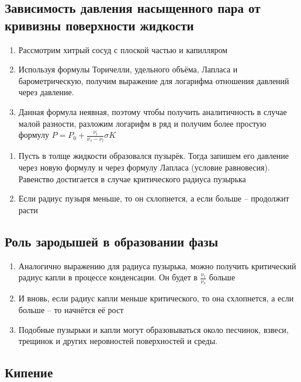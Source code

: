 \documentclass[a4paper, 14pt]{article}
\begin{document}
    \subsection{Зависимость давления насыщенного пара от кривизны поверхности жидкости}

    \begin{enumerate}
        \item Рассмотрим хитрый сосуд с плоской частью и капилляром
        \item Используя формулы Торичелли, удельного объёма, Лапласа и барометрическую, получим выражение для
        логарифма отношения давлений через давление.
        \item Данная формула неявная, поэтому чтобы получить аналитичность в случае малой разности, разложим логарифм
        в ряд и получим более простую формулу $P = P_0 + \frac{\nu_l}{\nu_s - \nu_l}\sigma K$
    \end{enumerate}

    \begin{enumerate}
        \item Пусть в толще жидкости образовался пузырёк.
        Тогда запишем его давление через новую формулу и через формулу Лапласа (условие равновесия).
        Равенство достигается в случае критического радиуса пузырька
        \item Если радиус пузыря меньше, то он схлопнется, а если больше -- продолжит расти
    \end{enumerate}

    \subsection{Роль зародышей в образовании фазы}

    \begin{enumerate}
        \item Аналогично выражению для радиуса пузырька, можно получить критический радиус капли в процессе
        конденсации.
        Он будет в $\frac{\nu_l}{\nu_s}$ больше
        \item И вновь, если радиус капли меньше критического, то она схлопнется, а если больше -- то начнётся её рост
        \item Подобные пузырьки и капли могут образовываться около песчинок, взвеси, трещинок и других неровностей
        поверхностей и среды.
    \end{enumerate}

    \subsection{Кипение}
\end{document}
